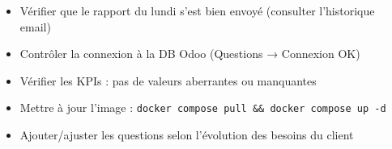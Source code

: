 \documentclass[11pt, a4paper]{article}
\begin{document}
\begin{checklist}
  \begin{itemize}
    \item[$\square$] Vérifier que le rapport du lundi s'est bien envoyé (consulter l'historique email)
    \item[$\square$] Contrôler la connexion à la DB Odoo (Questions → Connexion OK)
    \item[$\square$] Vérifier les KPIs : pas de valeurs aberrantes ou manquantes
    \item[$\square$] Mettre à jour l'image : \texttt{docker compose pull \&\& docker compose up -d}
    \item[$\square$] Ajouter/ajuster les questions selon l'évolution des besoins du client
  \end{itemize}
\end{checklist}
\end{document}
